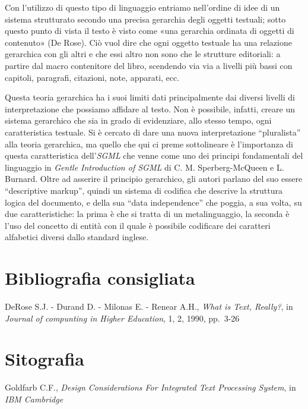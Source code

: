 \documentclass[
  b5paper,
  twoside,
  12pt,
  chapterprefix=false,
  bibliography=totocnumbered,
  parskip=false]{scrbook}
\begin{document}
Con l'utilizzo di questo tipo di linguaggio entriamo nell'ordine di idee
di un sistema strutturato secondo una precisa gerarchia degli oggetti
testuali; sotto questo punto di vista il testo è visto come «una
gerarchia ordinata di oggetti di contenuto» (De Rose). Ciò vuol dire che
ogni oggetto testuale ha una relazione gerarchica con gli altri e che
essi altro non sono che le strutture editoriali: a partire dal macro
contenitore del libro, scendendo via via a livelli più bassi con
capitoli, paragrafi, citazioni, note, apparati, ecc.

Questa teoria gerarchica ha i suoi limiti dati principalmente dai
diversi livelli di interpretazione che possiamo affidare al testo. Non è
possibile, infatti, creare un sistema gerarchico che sia in grado di
evidenziare, allo stesso tempo, ogni caratteristica testuale. Si è
cercato di dare una nuova interpretazione \enquote{pluralista} alla teoria
gerarchica, ma quello che qui ci preme sottolineare è l'importanza di
questa caratteristica dell'\emph{SGML} che venne come uno dei principi
fondamentali del linguaggio in \emph{Gentle Introduction of SGML} di C. M.
Sperberg-McQueen e L. Burnard. Oltre ad asserire il principio
gerarchico, gli autori parlano del suo essere \enquote{descriptive markup},
quindi un sistema di codifica che descrive la struttura logica del
documento, e della sua \enquote{data independence} che poggia, a sua volta, su
due caratteristiche: la prima è che si tratta di un metalinguaggio, la
seconda è l'uso del concetto di entità con il quale è possibile
codificare dei caratteri alfabetici diversi dallo standard inglese.

\hypertarget{bibliografia-consigliata-23}{%
\section*{Bibliografia consigliata}\label{bibliografia-consigliata-23}}

DeRose S.J. - Durand D. - Milonas E. - Renear A.H., \emph{What is Text,
Really?}, in \emph{Journal of compunting in Higher Education}, 1, 2, 1990,
pp.~3-26

\hypertarget{sitografia-30}{%
\section*{Sitografia}\label{sitografia-30}}

Goldfarb C.F., \emph{Design Considerations For Integrated Text Processing
System}, in \emph{IBM Cambridge}
\end{document}
